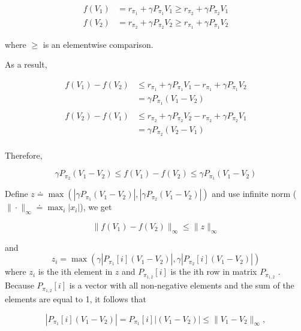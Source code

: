 \begin{align*}
	f(V_{1}) & =r_{\pi_{1}}+\gamma P_{\pi_{1}}V_{1} \ge r_{\pi_{2}}+\gamma P_{\pi_{2}}V_{1} \\
	f(V_{2}) & =r_{\pi_{2}}+\gamma P_{\pi_{2}}V_{2} \ge r_{\pi_{1}}+\gamma P_{\pi_{1}}V_{2}
\end{align*}

where $\ge$ is an elementwise comparison. \par
As a result,

\begin{align*}
	f(V_{1})-f(V_{2}) & \le r_{\pi_{1}}+\gamma P_{\pi_{1}}V_{1}-r_{\pi_{1}}+\gamma P_{\pi_{1}}V_{2} \\
	                  & =\gamma P_{\pi_{1}}(V_{1}-V_{2})                                            \\ \\
	f(V_{2})-f(V_{1}) & \le r_{\pi_{2}}+\gamma P_{\pi_{2}}V_{2}-r_{\pi_{2}}+\gamma P_{\pi_{2}}V_{1} \\
	                  & =\gamma P_{\pi_{2}}(V_{2}-V_{1})                                            \\
\end{align*}

Therefore,

\begin{equation*}
	\gamma P_{\pi_{2}}(V_{1}-V_{2})\le f(V_{1})-f(V_{2}) \le \gamma P_{\pi_{1}}(V_{1}-V_{2})
\end{equation*}

Define $z\doteq\max(|\gamma P_{\pi_{1}}(V_{1}-V_{2})|, |\gamma P_{\pi_{2}}(V_{1}-V_{2})|)$ and use infinite norm
($\|\cdot\|_{\infty}\doteq\max_{i}|x_{i}|$), we get

\begin{equation*}
	\|f(V_{1})-f(V_{2})\|_{\infty}\le\|z\|_{\infty}
\end{equation*}

and
\begin{equation*}
	z_{i}=\max(\gamma|P_{\pi_{1}}[i](V_{1}-V_{2})|,\gamma|P_{\pi_{2}}[i](V_{1}-V_{2})|)
\end{equation*}
where $z_{i}$ is the ith element in $z$ and $P_{\pi_{1,2}}[i]$ is the ith row in matrix $P_{\pi_{1,2}}$ .
Because $P_{\pi_{1,2}}[i]$ is a vector with all non-negative elements and the sum of the elements are equal to 1,  it follows that

\begin{equation*}
	|P_{\pi_{1}}[i](V_{1}-V_{2})|=P_{\pi_{1}}[i]|(V_{1}-V_{2})|\le\|V_{1}-V_{2}\|_{\infty},
\end{equation*}

